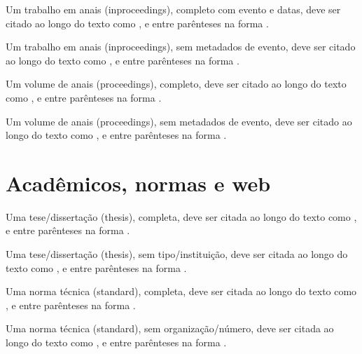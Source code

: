 \documentclass[a4paper,12pt]{article}
\begin{document}
Um trabalho em anais (inproceedings), completo com evento e datas, deve ser citado ao longo do texto como \citet{inproc-1-complete}, e entre parênteses na forma \citep{inproc-1-complete}.


Um trabalho em anais (inproceedings), sem metadados de evento, deve ser citado ao longo do texto como \citet{inproc-2-missing-event}, e entre parênteses na forma \citep{inproc-2-missing-event}.


Um volume de anais (proceedings), completo, deve ser citado ao longo do texto como \citet{proc-1-complete}, e entre parênteses na forma \citep{proc-1-complete}.


Um volume de anais (proceedings), sem metadados de evento, deve ser citado ao longo do texto como \citet{proc-2-missing-event}, e entre parênteses na forma \citep{proc-2-missing-event}.



\section*{Acadêmicos, normas e web}

Uma tese/dissertação (thesis), completa, deve ser citada ao longo do texto como \citet{thesis-1-complete}, e entre parênteses na forma \citep{thesis-1-complete}.


Uma tese/dissertação (thesis), sem tipo/instituição, deve ser citada ao longo do texto como \citet{thesis-2-missing-type-institution}, e entre parênteses na forma \citep{thesis-2-missing-type-institution}.


Uma norma técnica (standard), completa, deve ser citada ao longo do texto como \citet{std-1-complete}, e entre parênteses na forma \citep{std-1-complete}.


Uma norma técnica (standard), sem organização/número, deve ser citada ao longo do texto como \citet{std-2-missing-organization-number}, e entre parênteses na forma \citep{std-2-missing-organization-number}.

\end{document}
